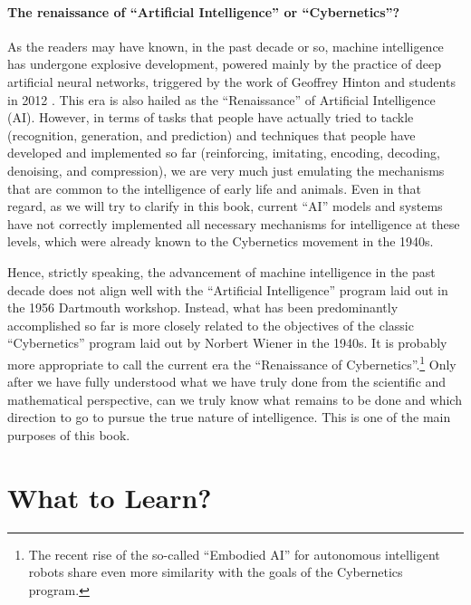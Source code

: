 \documentclass[\toplevelprefix/book-main.tex]{subfiles}
\begin{document}
\paragraph{The renaissance of ``Artificial Intelligence'' or ``Cybernetics''?}
As the readers may have known, in the past decade or so, machine intelligence has undergone explosive development, powered mainly by the practice of deep artificial neural networks, triggered by the work of Geoffrey Hinton and students in 2012 \cite{krizhevsky2012imagenet}. This era is also hailed as the ``Renaissance'' of Artificial Intelligence (AI). However, in terms of tasks that people have actually tried to tackle (recognition, generation, and prediction) and techniques that people have developed and implemented so far (reinforcing, imitating, encoding, decoding, denoising, and compression), we are very much just emulating the mechanisms that are common to the intelligence of early life and animals. Even in that regard, as we will try to clarify in this book, current ``AI'' models and systems have not correctly implemented all necessary mechanisms for intelligence at these levels, which were already known to the Cybernetics movement in the 1940s. 

Hence, strictly speaking, the advancement of machine intelligence in the past decade does not align well with the ``Artificial Intelligence'' program laid out in the 1956 Dartmouth workshop. Instead, what has been predominantly accomplished so far is more closely related to the objectives of the classic ``Cybernetics'' program laid out by Norbert Wiener in the 1940s. It is probably more appropriate to call the current era the ``Renaissance of Cybernetics''.\footnote{The recent rise of the so-called ``Embodied AI'' for autonomous intelligent robots share even more similarity with the goals of the Cybernetics program.} Only after we have fully understood what we have truly done from the scientific and mathematical perspective, can we truly know what remains to be done and which direction to go to pursue the true nature of intelligence. This is one of the main purposes of this book. 


\section{What to Learn?}
\label{sec:what-to-learn}
\end{document}
